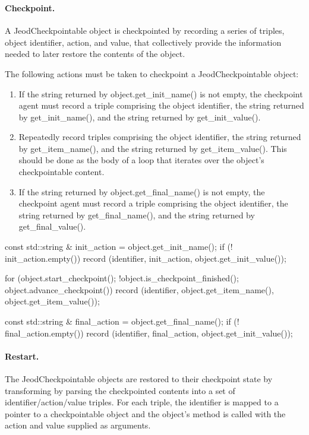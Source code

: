\subsubsection{\SIMINTERFACE}
\paragraph{Checkpoint.}
A JeodCheckpointable object is checkpointed by recording a series of triples,
object identifier, action, and value, that collectively provide the information
needed to later restore the contents of the object.

The following actions must be taken to checkpoint a JeodCheckpointable object:
\begin{enumerate}
\item If the string returned by object.get\_init\_name() is not empty,
the checkpoint agent must record a triple comprising
the object identifier,
the string returned by get\_init\_name(), and
the string returned by get\_init\_value().
\item Repeatedly record triples comprising
the object identifier,
the string returned by get\_item\_name(), and
the string returned by get\_item\_value().
This should be done as the body of a loop that iterates
over the object's checkpointable content.
\item If the string returned by object.get\_final\_name() is not empty,
the checkpoint agent must record a triple comprising
the object identifier,
the string returned by get\_final\_name(), and
the string returned by get\_final\_value().
\end{enumerate}
\begin{codeblock}
const std::string & init_action = object.get_init_name();
if (! init_action.empty()) {
   record (identifier, init_action, object.get_init_value());
}

for (object.start_checkpoint();
     !object.is_checkpoint_finished();
     object.advance_checkpoint()) {
   record (identifier, object.get_item_name(), object.get_item_value());
}

const std::string & final_action = object.get_final_name();
if (! final_action.empty()) {
   record (identifier, final_action, object.get_init_value());
}
\end{codeblock}

\paragraph{Restart.}
The JeodCheckpointable objects are restored to their checkpoint state by
transforming by parsing the checkpointed contents into
a set of identifier/action/value triples. For each triple,
the identifier is mapped to a pointer to a checkpointable object
and the object's  method is called with the
action and value supplied as arguments.

